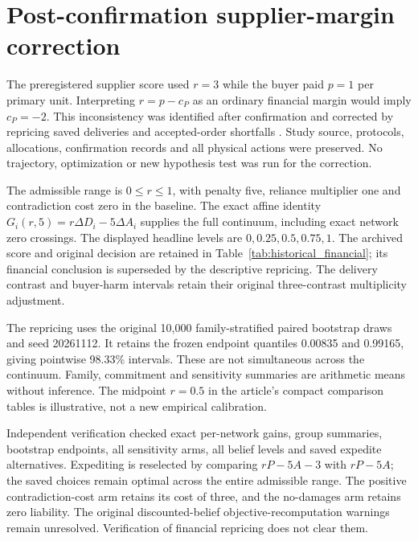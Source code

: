 \documentclass[preprint,11pt,authoryear]{elsarticle}
\begin{document}
\clearpage
\section{Post-confirmation supplier-margin correction}\label{supp:margin}
The preregistered supplier score used $r=3$ while the buyer paid $p=1$ per primary unit. Interpreting $r=p-c_P$ as an ordinary financial margin would imply $c_P=-2$. This inconsistency was identified after confirmation and corrected by repricing saved deliveries and accepted-order shortfalls . Study source, protocols, allocations, confirmation records and all physical actions were preserved. No trajectory, optimization or new hypothesis test was run for the correction.

The admissible range is $0\le r\le1$, with penalty five, reliance multiplier one and contradiction cost zero in the baseline. The exact affine identity $G_i(r,5)=r\Delta D_i-5\Delta A_i$ supplies the full continuum, including exact network zero crossings. The displayed headline levels are $0,0.25,0.5,0.75,1$. The archived score and original decision are retained in Table~\ref{tab:historical_financial}; its financial conclusion is superseded by the descriptive repricing. The delivery contrast and buyer-harm intervals retain their original three-contrast multiplicity adjustment.

The repricing uses the original 10,000 family-stratified paired bootstrap draws and seed 20261112. It retains the frozen endpoint quantiles 0.00835 and 0.99165, giving pointwise 98.33\% intervals. These are not simultaneous across the continuum. Family, commitment and sensitivity summaries are arithmetic means without inference. The midpoint $r=0.5$ in the article's compact comparison tables is illustrative, not a new empirical calibration.

Independent verification checked exact per-network gains, group summaries, bootstrap endpoints, all sensitivity arms, all belief levels and saved expedite alternatives. Expediting is reselected by comparing $rP-5A-3$ with $rP-5A$; the saved choices remain optimal across the entire admissible range. The positive contradiction-cost arm retains its cost of three, and the no-damages arm retains zero liability. The original discounted-belief objective-recomputation warnings remain unresolved. Verification of financial repricing does not clear them.
\end{document}
